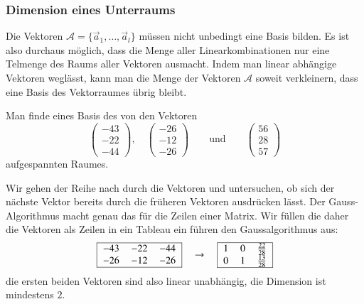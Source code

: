\subsubsection{Dimension eines Unterraums}
Die Vektoren $\mathcal{A}=\{\vec{a}_1,\dots,\vec{a}_l\}$ müssen nicht
unbedingt eine Basis bilden.
Es ist also durchaus möglich, dass die Menge aller Linearkombinationen
nur eine Telmenge des Raums aller Vektoren ausmacht.
Indem man linear abhängige Vektoren weglässt, kann man die Menge der
Vektoren $\mathcal{A}$ soweit verkleinern, dass eine Basis des 
Vektorraumes übrig bleibt.

\begin{beispiel}
Man finde eines Basis des von den Vektoren 
\[
\begin{pmatrix}
  -43\\  -22\\  -44
\end{pmatrix},\quad
\begin{pmatrix}
  -26\\  -12\\  -26
\end{pmatrix}
\qquad\text{und}\qquad
\begin{pmatrix}
   56\\   28\\   57
\end{pmatrix}
\]
aufgespannten Raumes.

\smallskip

{\parindent=0pt Wir} gehen der Reihe nach durch die Vektoren und untersuchen,
ob sich der nächste Vektor bereits durch die früheren Vektoren 
ausdrücken lässt.
Der Gauss-Algorithmus macht genau das für die Zeilen einer Matrix.
Wir füllen die daher die Vektoren als Zeilen in ein Tableau ein führen
den Gaussalgorithmus aus:
\[
\begin{tabular}{|>{$}c<{$}>{$}c<{$}>{$}c<{$}|}
\hline
  -43&  -22&  -44\\
  -26&  -12&  -26\\
\hline
\end{tabular}
\quad\rightarrow\quad
\begin{tabular}{|>{$}c<{$}>{$}c<{$}>{$}c<{$}|}
\hline
1&0&\frac{22}{28}\\
0&1&\frac{13}{28}\\
\hline
\end{tabular}
\]
die ersten beiden Vektoren sind also linear unabhängig, die Dimension
ist mindestens $2$.


\end{beispiel}
